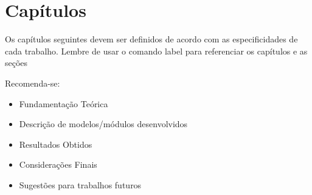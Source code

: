 \chapter{Capítulos}
\label{cap:capitulos}

Os capítulos seguintes devem ser definidos de acordo com as especificidades de cada trabalho. Lembre de usar o comando label para referenciar os capítulos e as seções

Recomenda-se:

\begin{itemize}
  \item Fundamentação Teórica
  \item Descrição de modelos/módulos desenvolvidos
  \item Resultados Obtidos
  \item Considerações Finais
  \item Sugestões para trabalhos futuros
\end{itemize}
